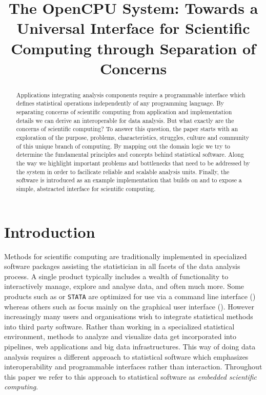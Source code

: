 
\title{The OpenCPU System: Towards a Universal Interface for Scientific Computing through Separation of Concerns}

\maketitle

\begin{abstract}
Applications integrating analysis components require a programmable interface which defines statistical operations independently of any programming language. By separating concerns of scientific computing from application and implementation details we can derive an interoperable \API for data analysis. But what exactly are the concerns of scientific computing? To answer this question, the paper starts with an exploration of the purpose, problems, characteristics, struggles, culture and community of this unique branch of computing. By mapping out the domain logic we try to determine the fundamental principles and concepts behind statistical software. Along the way we highlight important problems and bottlenecks that need to be addressed by the system in order to facilicate reliable and scalable analysis units. Finally, the \OpenCPU software is introduced as an example implementation that builds on \HTTP and \R to expose a simple, abstracted interface for scientific computing.
\end{abstract}

\section{Introduction}

Methods for scientific computing are traditionally implemented in specialized software packages assisting the statistician in all facets of the data analysis process. A single product typically includes a wealth of functionality to interactively manage, explore and analyse data, and often much more. Some products such as \R or \texttt{STATA} are optimized for use via a command line interface (\CLI) whereas others such as \SPSS focus mainly on the graphical user interface (\GUI). However increasingly many users and organisations wish to integrate statistical methods into third party software. Rather than working in a specialized statistical environment, methods to analyze and visualize data get incorporated into pipelines, web applications and big data infrastructures. This way of doing data analysis requires a different approach to statistical software which emphasizes interoperability and programmable interfaces rather than \UI interaction. Throughout this paper we refer to this approach to statistical software as \emph{embedded scientific computing}.

